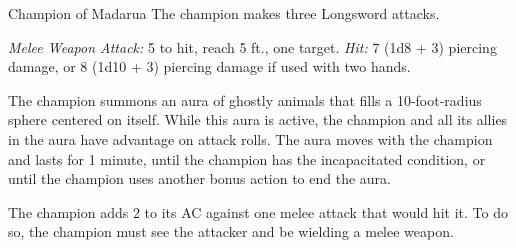 \documentclass[10pt,a4paper,twoside,bg=print,twocolumn,openany,nodeprecatedcode]{dndbook}
\begin{document}
\begin{DndMonster}[float=t]{Champion of Madarua}
\DndMonsterBasics[
armor-class = {13 (\textit{hide armor})},
hit-points = {\DndDice{6d8 + 12}},
speed = {30 ft.}
]
\DndMonsterAbilityScores[
 str = 17,
 dex = 12,
 con = 15,
 int = 12,
 wis = 12,
 cha = 14
]
\DndMonsterDetails[
saving-throws = {Str +5, Dex +3},
skills = {Acrobatics +3, Religion +3},
languages = {Common},
challenge = 2,
]
The champion makes three Longsword attacks.

\textsl{Melee Weapon Attack:} 5 to hit, reach 5 ft., one target. \textsl{Hit:} 7 (1d8 + 3) piercing damage, or 8 (1d10 + 3) piercing damage if used with two hands.

The champion summons an aura of ghostly animals that fills a 10-foot-radius sphere centered on itself. While this aura is active, the champion and all its allies in the aura have advantage on attack rolls. The aura moves with the champion and lasts for 1 minute, until the champion has the incapacitated condition, or until the champion uses another bonus action to end the aura.

The champion adds 2 to its AC against one melee attack that would hit it. To do so, the champion must see the attacker and be wielding a melee weapon.

\end{DndMonster}
\end{document}
